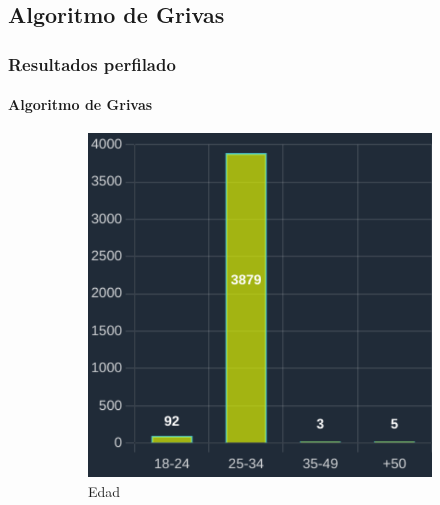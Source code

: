 \documentclass{beamer}
\begin{document}

\subsection{Algoritmo de Grivas}
\begin{frame}
	\frametitle{Resultados perfilado}
	\framesubtitle{Algoritmo de Grivas}
	 \begin{figure}[H]
		\centering
		\begin{subfigure}{0.3\textwidth}
				\includegraphics[width=\textwidth]{imaxes/capturas-app/graficos/grivas/grafico-edad-grivas.png}
				\caption{Edad}
				\label{subfig:blm/resultados-edad-moda}
			\end{subfigure}
			\begin{subfigure}{0.3\textwidth}

\end{subfigure}
\end{figure}
\end{frame}
\end{document}
